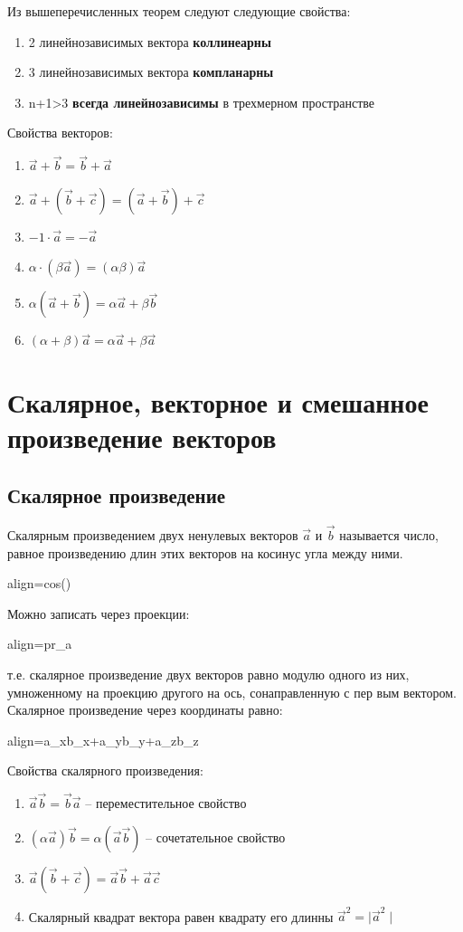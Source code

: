\documentclass[oneside]{book}
\newcommand{\boxedeq}[2]{\begin{empheq}[box={\fboxsep=6pt\fbox}]{align}\label{#1}#2\end{empheq}}
\begin{document}
\begin{enumerate}
\begin{itemize}
\begin{enumerate}
Из вышеперечисленных теорем следуют следующие свойства:
\begin{enumerate}
	\item 2 линейнозависимых вектора \textbf{коллинеарны}
	\item 3 линейнозависимых вектора \textbf{компланарны} 
	\item n+1>3 \textbf{всегда линейнозависимы} в трехмерном пространстве
	\end{enumerate}
Свойства векторов:
\begin{enumerate}
	\item $\vec{a}+\vec{b}=\vec{b}+\vec{a}$
	\item $\vec{a}+(\vec{b}+\vec{c})=(\vec{a}+\vec{b})+\vec{c}$
	\item $-1\cdot\vec{a}=-\vec{a}$
	\item $\alpha\cdot(\beta\vec{a})=(\alpha\beta)\vec{a}$
	\item $\alpha(\vec{a}+\vec{b})=\alpha\vec{a}+\beta\vec{b}$
	\item $(\alpha+\beta)\vec{a}=\alpha\vec{a}+\beta\vec{a}$
\end{enumerate}

\chapter{Скалярное, векторное и смешанное произведение векторов}
\section{Скалярное произведение}
Скалярным произведением двух ненулевых векторов $\vec{a}$ и $\vec{b}$ называется число, равное произведению длин этих векторов на ко­синус угла между ними.
\boxedeq{eq:*}{\cdot{}=\mid\vec{a}\mid\cdot\mid\vec{b}\mid cos(\phi)}
Можно записать через проекции:
\boxedeq{eq:*}{\cdot{}=\mid\vec{a}\mid\cdot pr_{a} \vec{b}}
т.е. скалярное произведение двух векторов равно модулю одного
из
них, умноженному на проекцию другого на ось, сонаправленную с пер­
вым вектором.
Скалярное произведение через координаты равно:
\boxedeq{eq:*}{\cdot{}=a_{x}b_{x}+a_{y}b_{y}+a_{z}b_{z}}
Свойства скалярного произведения:
\begin{enumerate}
	\item $\vec{a}\vec{b}=\vec{b}\vec{a}$ -- переместительное свойство
	\item $(\alpha\vec{a})\vec{b}=\alpha(\vec{a}\vec{b})$ -- сочетательное свойство
	\item $\vec{a}(\vec{b}+\vec{c})=\vec{a}\vec{b}+\vec{a}\vec{c}$
	\item Скалярный квадрат вектора равен квадрату его длинны $\vec{a}^{2}=\mid\vec{a}^{2}\mid$
\end{enumerate}


\end{enumerate}
\end{itemize}
\end{enumerate}
\end{document}
